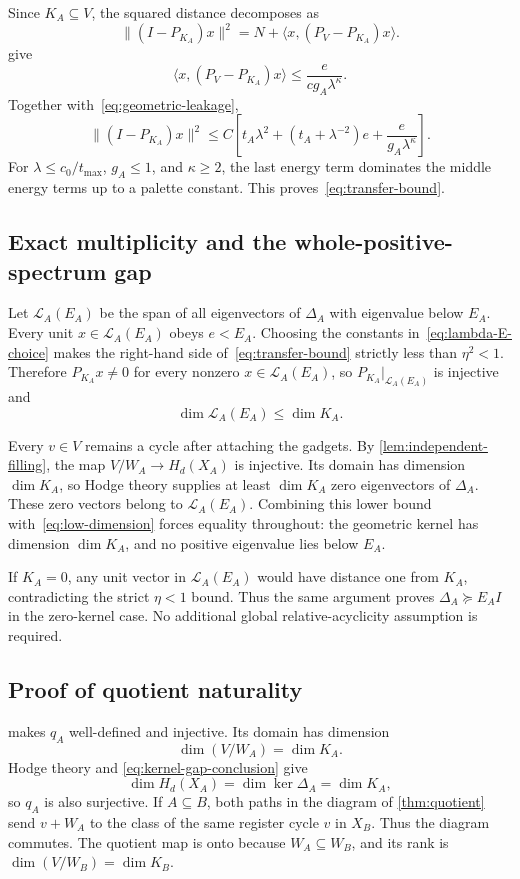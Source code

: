 Since \(K_A\subseteq V\), the squared distance decomposes as
\[
\|(I-P_{K_A})x\|^2
=N+\langle x,(P_V-P_{K_A})x\rangle.
\]
 give
\[
\langle x,(P_V-P_{K_A})x\rangle
\le\frac{e}{cg_A\lambda^\kappa}.
\]
Together with~\cref{eq:geometric-leakage},
\[
\|(I-P_{K_A})x\|^2
\le C\left[t_A\lambda^2+(t_A+\lambda^{-2})e
+\frac{e}{g_A\lambda^\kappa}\right].
\]
For \(\lambda\le c_0/t_{\max}\), \(g_A\le1\), and \(\kappa\ge2\), the last energy term dominates the middle energy terms up to a palette constant. This proves~\cref{eq:transfer-bound}.

\subsection{Exact multiplicity and the whole-positive-spectrum gap}

Let \(\mathcal L_A(E_A)\) be the span of all eigenvectors of \(\Delta_A\) with eigenvalue below \(E_A\). Every unit \(x\in\mathcal L_A(E_A)\) obeys \(e<E_A\). Choosing the constants in~\cref{eq:lambda-E-choice} makes the right-hand side of~\cref{eq:transfer-bound} strictly less than \(\eta^2<1\). Therefore \(P_{K_A}x\neq0\) for every nonzero \(x\in\mathcal L_A(E_A)\), so \(P_{K_A}|_{\mathcal L_A(E_A)}\) is injective and
\begin{equation}
\label{eq:low-dimension}
\dim\mathcal L_A(E_A)\le\dim K_A.
\end{equation}

Every \(v\in V\) remains a cycle after attaching the gadgets. By \cref{lem:independent-filling}, the map \(V/W_A\to H_d(X_A)\) is injective. Its domain has dimension \(\dim K_A\), so Hodge theory supplies at least \(\dim K_A\) zero eigenvectors of \(\Delta_A\). These zero vectors belong to \(\mathcal L_A(E_A)\). Combining this lower bound with~\cref{eq:low-dimension} forces equality throughout: the geometric kernel has dimension \(\dim K_A\), and no positive eigenvalue lies below \(E_A\).

If \(K_A=0\), any unit vector in \(\mathcal L_A(E_A)\) would have distance one from \(K_A\), contradicting the strict \(\eta<1\) bound. Thus the same argument proves \(\Delta_A\succeq E_AI\) in the zero-kernel case. No additional global relative-acyclicity assumption is required.

\subsection{Proof of quotient naturality}
\label{app:quotient-proof}

 makes \(q_A\) well-defined and injective.
Its domain has dimension
\[
\dim(V/W_A)=\dim K_A.
\]
Hodge theory and
\cref{eq:kernel-gap-conclusion} give
\[
\dim H_d(X_A)=\dim\ker\Delta_A=\dim K_A,
\]
so \(q_A\) is also surjective.  If \(A\subseteq B\), both paths in the
diagram of \cref{thm:quotient} send \(v+W_A\) to the class of the same
register cycle \(v\) in \(X_B\).  Thus the diagram commutes.  The quotient
map is onto because \(W_A\subseteq W_B\), and its rank is
\(\dim(V/W_B)=\dim K_B\).
